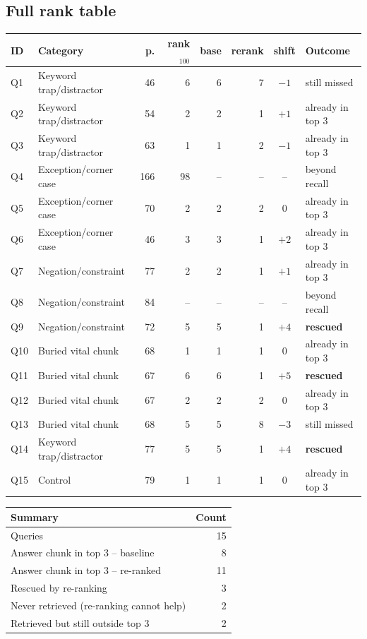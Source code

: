 \documentclass[11pt,a4paper]{article}
\begin{document}
\subsection{Full rank table}
\begin{center}\footnotesize\begin{tabular}{llrrrrcl}\toprule
\textbf{ID} & \textbf{Category} & \textbf{p.} & \textbf{rank$_{100}$} & \textbf{base} & \textbf{rerank} & \textbf{shift} & \textbf{Outcome} \\ \midrule
Q1 & Keyword trap/distractor & 46 & 6 & 6 & 7 & $-1$ & still missed \\
Q2 & Keyword trap/distractor & 54 & 2 & 2 & 1 & $+1$ & already in top 3 \\
Q3 & Keyword trap/distractor & 63 & 1 & 1 & 2 & $-1$ & already in top 3 \\
Q4 & Exception/corner case & 166 & 98 & -- & -- & -- & beyond recall \\
Q5 & Exception/corner case & 70 & 2 & 2 & 2 & 0 & already in top 3 \\
Q6 & Exception/corner case & 46 & 3 & 3 & 1 & $+2$ & already in top 3 \\
Q7 & Negation/constraint & 77 & 2 & 2 & 1 & $+1$ & already in top 3 \\
Q8 & Negation/constraint & 84 & -- & -- & -- & -- & beyond recall \\
Q9 & Negation/constraint & 72 & 5 & 5 & 1 & $+4$ & \textbf{rescued} \\
Q10 & Buried vital chunk & 68 & 1 & 1 & 1 & 0 & already in top 3 \\
Q11 & Buried vital chunk & 67 & 6 & 6 & 1 & $+5$ & \textbf{rescued} \\
Q12 & Buried vital chunk & 67 & 2 & 2 & 2 & 0 & already in top 3 \\
Q13 & Buried vital chunk & 68 & 5 & 5 & 8 & $-3$ & still missed \\
Q14 & Keyword trap/distractor & 77 & 5 & 5 & 1 & $+4$ & \textbf{rescued} \\
Q15 & Control & 79 & 1 & 1 & 1 & 0 & already in top 3 \\
\bottomrule\end{tabular}\end{center}
\begin{center}\begin{tabular}{lr}\toprule
\textbf{Summary} & \textbf{Count} \\ \midrule
Queries & 15 \\
Answer chunk in top 3 -- baseline & 8 \\
Answer chunk in top 3 -- re-ranked & 11 \\
Rescued by re-ranking & 3 \\
Never retrieved (re-ranking cannot help) & 2 \\
Retrieved but still outside top 3 & 2 \\
\bottomrule\end{tabular}\end{center}
\end{document}

